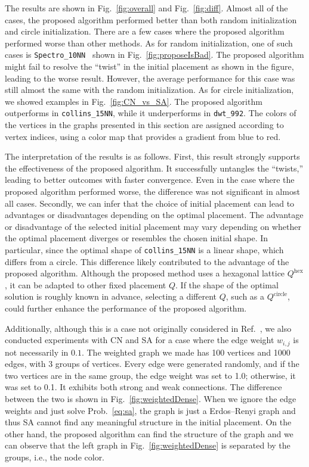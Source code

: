 \documentclass[dvipdfmx,10pt,journal,compsoc]{IEEEtran}
\begin{document}
The results are shown in Fig.~\ref{fig:overall} and Fig.~\ref{fig:diff}.
Almost all of the cases, the proposed algorithm performed better than both random initialization and circle initialization.
There are a few cases where the proposed algorithm performed worse than other methods.
As for random initialization, one of such cases is \texttt{Spectro\_10NN
} shown in Fig.~\ref{fig:proposeIsBad}. The proposed algorithm might fail to resolve the ``twist'' in the initial placement as shown in the figure, leading to the worse result. However, the average performance for this case was still almost the same with the random initialization.
As for circle initialization, we showed examples in Fig.~\ref{fig:CN_vs_SA}.
The proposed algorithm outperforms in \texttt{collins\_15NN}, while it underperforms in \texttt{dwt\_992}.
The colors of the vertices in the graphs presented in this section are assigned according to vertex indices, using a color map that provides a gradient from blue to red.

The interpretation of the results is as follows.
First, this result strongly supports the effectiveness of the proposed algorithm. It successfully untangles the ``twists,'' leading to better outcomes with faster convergence. Even in the case where the proposed algorithm performed worse, the difference was not significant in almost all cases.
Secondly, we can infer that the choice of initial placement can lead to advantages or disadvantages depending on the optimal placement.
The advantage or disadvantage of the selected initial placement may vary depending on whether the optimal placement diverges or resembles the chosen initial shape.
In particular, since the optimal shape of \texttt{collins\_15NN} is a linear shape, which differs from a circle.
This difference likely contributed to the advantage of the proposed algorithm.
Although the proposed method uses a hexagonal lattice $Q^\mathrm{hex}$, it can be adapted to other fixed placement $Q$.
If the shape of the optimal solution is roughly known in advance, selecting a different $Q$, such as a $Q^\mathrm{circle}$, could further enhance the performance of the proposed algorithm.

Additionally, although this is a case not originally considered in Ref.~\cite{ghassemitoosiSimulatedAnnealingPreProcessing2016}, we also conducted experiments with \textsf{CN} and \textsf{SA} for a case where the edge weight $w_{i,j}$ is not necessarily in $\qty{0,1}$.
The weighted graph we made has 100 vertices and 1000 edges, with 3 groups of vertices.
Every edge were generated randomly, and if the two vertices are in the same group, the edge weight was set to 1.0; otherwise, it was set to 0.1. It exhibits both strong and weak connections.
The difference between the two is shown in Fig.~\ref{fig:weightedDense}.
When we ignore the edge weights and just solve Prob.~\eqref{eq:sa}, the graph is just a Erdos--Renyi graph and thus \textsf{SA} cannot find any meaningful structure in the initial placement.
On the other hand, the proposed algorithm can find the structure of the graph and we can observe that the left graph in Fig.~\ref{fig:weightedDense} is separated by the groups, i.e., the node color.
\end{document}

